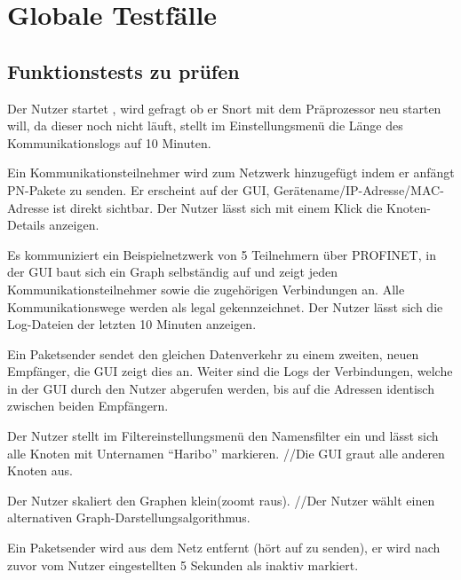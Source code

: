 \chapter{Globale Testfälle}

\section{Funktionstests zu prüfen}

\begin{description}[style=multiline, leftmargin=4cm, labelwidth=4cm]
  \item[\namedlabel{start}{Programm starten}] Der Nutzer startet \programname, wird gefragt ob er Snort mit dem Präprozessor neu starten will, da dieser noch nicht läuft, stellt im Einstellungsmenü die Länge des Kommunikationslogs auf 10 Minuten.
  \item[\namedlabel{addNetNode}{Kommunikationsteilnehmer hinzufügen}] Ein Kommunikationsteilnehmer wird zum Netzwerk hinzugefügt indem er anfängt PN-Pakete zu senden. Er erscheint auf der GUI, Gerätename/IP-Adresse/MAC-Adresse ist direkt sichtbar. Der Nutzer lässt sich mit einem Klick die Knoten-Details anzeigen.
  \item[\namedlabel{normalWatch}{Normale Netzwerküberwachung}] Es kommuniziert ein Beispielnetzwerk von 5 Teilnehmern über PROFINET, in der GUI baut sich ein Graph selbständig auf und zeigt jeden Kommunikationsteilnehmer sowie die zugehörigen Verbindungen an. Alle Kommunikationswege werden als legal gekennzeichnet. Der Nutzer lässt sich die Log-Dateien der letzten 10 Minuten anzeigen.
  \item[\namedlabel{guiDisplay}{Korrekte GUI Darstellung}] Ein Paketsender sendet den gleichen Datenverkehr zu einem zweiten, neuen Empfänger, die GUI zeigt dies an. Weiter sind die Logs der Verbindungen, welche in der GUI durch den Nutzer abgerufen werden, bis auf die Adressen identisch zwischen beiden Empfängern.
  \item[\namedlabel{filter}{Filter anwenden}] Der Nutzer stellt im Filtereinstellungsmenü den Namensfilter ein und lässt sich alle Knoten mit Unternamen “Haribo” markieren. //Die GUI graut alle anderen Knoten aus.
  \item[\namedlabel{guiChanging}{Graph verändern}] Der Nutzer skaliert den Graphen klein(zoomt raus). //Der Nutzer wählt einen alternativen Graph-Darstellungsalgorithmus.
  \item[\namedlabel{inactive}{Netzteilnehmer wird inaktiv}] Ein Paketsender wird aus dem Netz entfernt (hört auf zu senden), er wird nach zuvor vom Nutzer eingestellten 5 Sekunden als inaktiv markiert.

\end{description}
